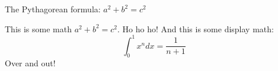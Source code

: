 
\newcommand{\DT}{{\mathbb S}}
\begin{theorem}
The Pythagorean formula: $a^2 + b^2 = c^2$
\end{theorem}
This is some math $a^2 + b^2 = c^2$.  Ho ho ho!
And this is some display math:\[\int_0^1 x^n dx = \frac{1}{n+1}\]
Over and out!

